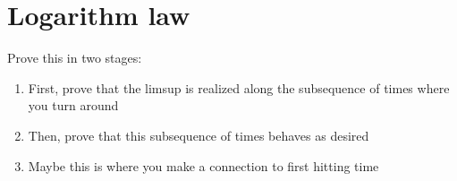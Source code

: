\documentclass[11pt]{amsart}
\theoremstyle{plain}
\theoremstyle{definition}
\theoremstyle{remark}
\begin{document}
\section{Logarithm law}

Prove this in two stages:
\begin{enumerate}
  \item First, prove that the limsup is realized along the subsequence of
    times where you turn around
  \item Then, prove that this subsequence of times behaves as desired
  \item Maybe this is where you make a connection to first hitting time
\end{enumerate}







\end{document}
